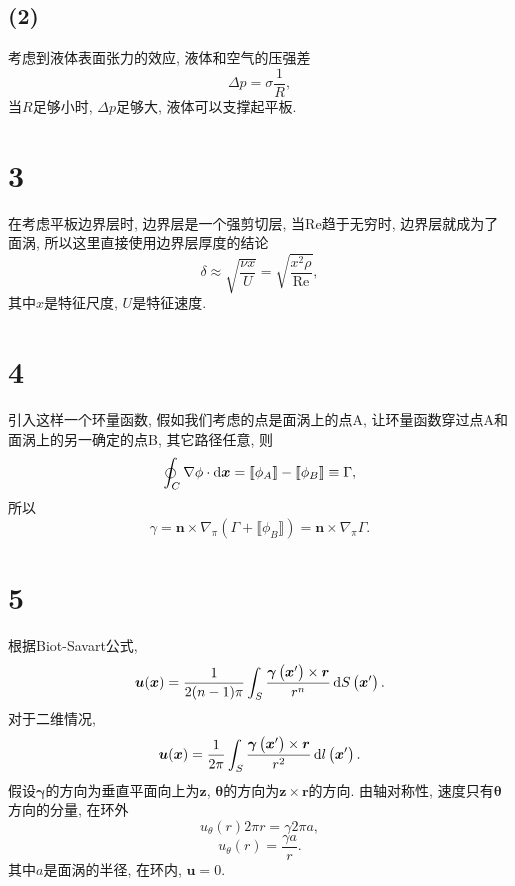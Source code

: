 \documentclass[12pt]{article}
\begin{document}
\subsection{(2)}

考虑到液体表面张力的效应, 液体和空气的压强差
\begin{equation}
	\Delta p = \sigma \frac{1}{R},
\end{equation}
当$R$足够小时, $\Delta p$足够大, 液体可以支撑起平板. 


\section{3}

在考虑平板边界层时, 边界层是一个强剪切层, 当$\mathrm{Re}$趋于无穷时, 边界层就成为了面涡, 所以这里直接使用边界层厚度的结论
\begin{equation}
	\delta \approx \sqrt{\frac{\nu x}{U}} = \sqrt{\frac{x^2\rho}{\mathrm{Re}}},
\end{equation}
其中$x$是特征尺度, $U$是特征速度. 

\section{4}

引入这样一个环量函数, 假如我们考虑的点是面涡上的点A, 让环量函数穿过点A和面涡上的另一确定的点B, 其它路径任意, 则
\begin{equation}
	\oint_C \nabla \phi \cdot \dif \bm{x} = \llbracket \phi_A \rrbracket - \llbracket \phi_B \rrbracket \equiv \Gamma,
\end{equation}
所以
\begin{equation}
	\gamma = \bm{n} \times \nabla_\pi (\Gamma + \llbracket \phi_B \rrbracket) = \bm{n} \times \nabla_\pi \Gamma.
\end{equation}

\section{5}

根据Biot-Savart公式, 
\begin{equation}
	\boldsymbol{u}(\boldsymbol{x})=\frac{1}{2(n-1) \pi} \int_{S} \frac{\bm{\gamma}\left(\boldsymbol{x}^{\prime}\right) \times \boldsymbol{r}}{r^{n}} \dif S\left(\boldsymbol{x}^{\prime}\right).
\end{equation}
对于二维情况, 
\begin{equation}
	\boldsymbol{u}(\boldsymbol{x})=\frac{1}{2 \pi} \int_{S} \frac{\bm{\gamma}\left(\boldsymbol{x}^{\prime}\right) \times \boldsymbol{r}}{r^{2}} \dif l\left(\boldsymbol{x}^{\prime}\right).
\end{equation}
假设$\bm{\gamma}$的方向为垂直平面向上为$\bm{z}$, $\bm{\theta}$的方向为$\bm{z}\times \bm{r}$的方向. 由轴对称性, 速度只有$\bm{\theta}$方向的分量, 在环外
\begin{equation}
	u_\theta(r) 2 \pi r = \gamma 2 \pi a,
\end{equation}
\begin{equation}
	u_\theta(r) = \frac{\gamma a}{r}.
\end{equation}
其中$a$是面涡的半径, 在环内, $\bm{u}=0$.
\end{document}
